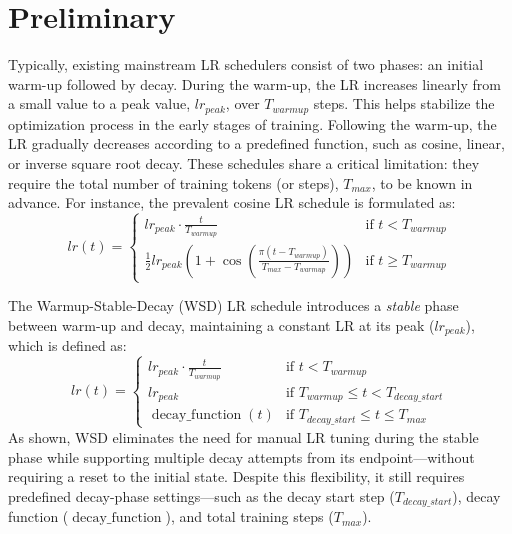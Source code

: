 

\section{Preliminary}
\label{sec:pre}

Typically, existing mainstream LR schedulers consist of two phases: an initial warm-up followed by decay. 
During the warm-up, the LR increases linearly from a small value to a peak value, $lr_{peak}$, over $T_{warmup}$ steps. This helps stabilize the optimization process in the early stages of training. Following the warm-up, the LR gradually decreases according to a predefined function, such as cosine, linear, or inverse square root decay. These schedules share a critical limitation: they require the total number of training tokens (or steps), $T_{max}$, to be known in advance.
For instance, the prevalent cosine LR schedule is formulated as:
\[
lr(t) = 
\begin{cases}
    lr_{peak} \cdot \frac{t}{T_{warmup}} & \text{if } t < T_{warmup} \\
    \frac{1}{2} lr_{peak} \left(1 + \cos\left(\frac{\pi(t - T_{warmup})}{T_{max} - T_{warmup}}\right)\right) & \text{if } t \ge T_{warmup}
\end{cases}
\]


The Warmup-Stable-Decay (WSD) LR schedule introduces a \emph{stable} phase between warm-up and decay, maintaining a constant LR at its peak (\(lr_{peak}\)), which is defined as:
\[
lr(t) = 
\begin{cases}
    lr_{peak} \cdot \frac{t}{T_{warmup}} & \text{if } t < T_{warmup} \\
    lr_{peak} & \text{if } T_{warmup} \le t < T_{decay\_start} \\
    \operatorname{decay\_function}(t) & \text{if } T_{decay\_start} \le t \le T_{max}
\end{cases}
\]
As shown, WSD eliminates the need for manual LR tuning during the stable phase while supporting multiple decay attempts from its endpoint—without requiring a reset to the initial state. 
Despite this flexibility, it still requires predefined decay-phase settings—such as the decay start step ($T_{decay\_start}$), decay function ($\operatorname{decay\_function}$), and total training steps ($T_{max}$). %











